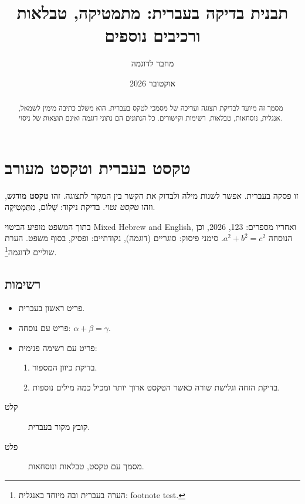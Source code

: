 \documentclass[11pt,a4paper]{article}
\title{תבנית בדיקה בעברית: מתמטיקה, טבלאות ורכיבים נוספים}
\author{מחבר לדוגמה}
\date{אוקטובר 2026}
\begin{document}
\maketitle
\begin{abstract}
מסמך זה מיועד לבדיקת תצוגה ועריכה של מסמכי לטקס בעברית.
הוא משלב כתיבה מימין לשמאל, אנגלית, נוסחאות, טבלאות, רשימות וקישורים.
כל הנתונים הם נתוני דוגמה ואינם תוצאות של ניסוי.
\end{abstract}

\begin{flushleft}

\end{flushleft}

\tableofcontents

\section{טקסט בעברית וטקסט מעורב}\label{sec:hebrew}
זו פסקה בעברית. אפשר לשנות מילה ולבדוק את הקשר בין המקור לתצוגה.
זהו \textbf{טקסט מודגש}, וזהו \emph{טקסט נטוי}.
בדיקת ניקוד: שָׁלוֹם, מַתֵּמָטִיקָה.

בתוך המשפט מופיע הביטוי \textenglish{Mixed Hebrew and English},
ואחריו מספרים: 123, 2026, וכן הנוסחה \(a^2+b^2=c^2\).
סימני פיסוק: סוגריים (דוגמה), נקודתיים: ופסיק, בסוף משפט.
הערת שוליים לדוגמה\footnote{הערה בעברית ובה מיוחד באנגלית: \textenglish{footnote test}.}.

\subsection{רשימות}
\begin{itemize}
  \item פריט ראשון בעברית.
  \item פריט עם נוסחה: \(\alpha+\beta=\gamma\).
  \item פריט עם רשימה פנימית:
    \begin{enumerate}
      \item בדיקת כיוון המספור.
      \item בדיקת הזחה וגלישת שורה כאשר הטקסט ארוך יותר ומכיל כמה מילים נוספות.
    \end{enumerate}
\end{itemize}
\begin{description}
  \item[קלט] קובץ מקור בעברית.
  \item[פלט] מסמך עם טקסט, טבלאות ונוסחאות.
\end{description}
\end{document}
